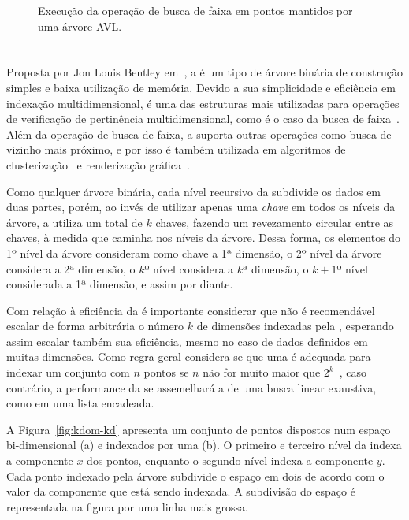\begin{figure}[ht]
\begin{minipage}[t]{0.48\textwidth}
    \caption{Execução da operação de busca de faixa em pontos mantidos por uma árvore AVL.}
    \label{img:pts-avl-query}
  \end{minipage}
\end{figure}



\section{\Kdtree{}}

Proposta por Jon Louis Bentley em~\cite{bentley1975}, a \kdtree{} é um tipo de
árvore binária de construção simples e baixa utilização de memória.
Devido a sua simplicidade e eficiência em indexação multidimensional,
é uma das estruturas mais utilizadas para operações de verificação de pertinência
multidimensional, como é o caso da busca de faixa~\cite{preparata2012computational}.
Além da operação de busca de faixa, a \kdtree{} suporta outras operações como busca de vizinho mais próximo, e por isso é também utilizada em algoritmos de
clusterização~\cite{kanungo2002efficient, indyk1998approximate}
e renderização gráfica~\cite{owens2007survey}.

Como qualquer árvore binária, cada nível recursivo da
\kdtree{} subdivide os dados em duas partes, porém, ao invés de utilizar
apenas uma \emph{chave} em todos os níveis da árvore, a \kdtree{} utiliza um
total de $k$ chaves, fazendo um revezamento circular entre as chaves, à medida
que caminha nos níveis da árvore.
Dessa forma, os elementos do 1º nível da árvore consideram como chave
a 1ª dimensão,
o 2º nível da árvore considera a 2ª dimensão, o $k$º nível considera a $k$ª dimensão,
o $k+1$º nível considerada a 1ª dimensão, e assim por diante.

Com relação à eficiência da \kdtree{} é importante considerar que não é
recomendável escalar de forma arbitrária o número $k$ de dimensões
indexadas pela \kdtree{}, esperando assim escalar também sua eficiência,
mesmo no caso de dados  definidos em muitas dimensões.
Como regra geral considera-se que uma \kdtree{} é adequada para indexar um
conjunto com $n$ pontos se $n$ não for muito maior que $2^k$~\cite{toth2004handbook},
caso contrário, a performance da \kdtree{} se assemelhará a de uma busca
linear exaustiva, como em uma lista encadeada.

A Figura~\ref{fig:kdom-kd} apresenta um conjunto de pontos dispostos num
espaço bi-dimensional (a) e indexados por uma  (b).
O primeiro e terceiro nível da  indexa a componente $x$ dos pontos,
enquanto o segundo nível indexa a componente $y$.
Cada ponto indexado pela árvore subdivide o espaço em dois de acordo
com o valor da componente que está sendo indexada.
A subdivisão do espaço é representada na figura por uma linha mais grossa.

